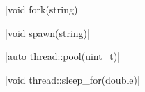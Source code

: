 \funcitem \cppinline|void fork(string)| 

\cppinline|void spawn(string)| 

\funcitem \cppinline|auto thread::pool(uint_t)| 

\funcitem \cppinline|void thread::sleep_for(double)| 
